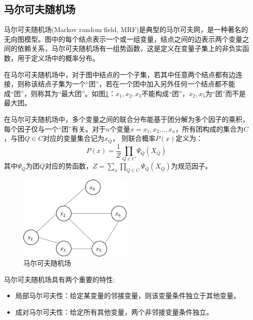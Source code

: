 \subsection{马尔可夫随机场}
马尔可夫随机场(Markov random field, MRF)是典型的马尔可夫网，是一种著名的无向图模型。图中的每个结点表示一个或一组变量，结点之间的边表示两个变量之间的依赖关系，马尔可夫随机场有一组势函数，这是定义在变量子集上的非负实函数，用于定义场中的概率分布。
\par 在马尔可夫随机场中，对于图中结点的一个子集，若其中任意两个结点都有边连接，则称该结点子集为一个“团”，若在一个团中加入另外任何一个结点都不能成“团”，则称其为“最大团”。如图\ref{mrf}：${x_1, x_2, x_3}$不能构成“团”，${x_2, x_5}$为“团”而不是最大团。
\par 在马尔可夫随机场中，多个变量之间的联合分布能基于团分解为多个因子的乘积，每个因子仅与一个“团”有关。对于$n$个变量$x = {x_1, x_2...,x_n}$，所有团构成的集合为$C$，与团$Q\in C$对应的变量集合记为$x_Q$， 则联合概率$P(x)$定义为：
$$P(x)=\frac{1}{Z} \prod_{Q\in C} \Psi_{Q}(X_{Q})$$
其中$ \Psi_{Q}$为团$Q$对应的势函数，$Z = \sum_x \prod_{Q\in C} \Psi_{Q}(X_{Q})$为规范因子。
\begin{figure}[htbp]
	\begin{center}
		\includegraphics[width=0.5\textwidth]{figures/5-1}
		\caption{马尔可夫随机场}
		\label{mrf}
	\end{center}
\end{figure}
\par 马尔可夫随机场具有两个重要的特性:
\begin{itemize}
	\item 局部马尔可夫性：给定某变量的邻接变量，则该变量条件独立于其他变量。
	\item 成对马尔可夫性：给定所有其他变量，两个非邻接变量条件独立。
\end{itemize}
